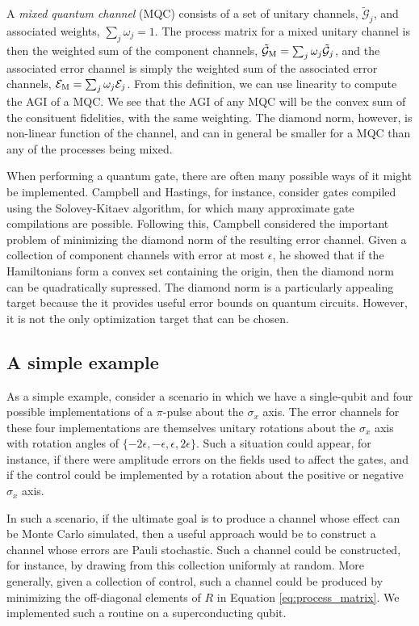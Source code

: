 \documentclass[aps,nofootinbib,pra,notitlepage,twocolumn]{revtex4-1}
\newcommand{\actual}{\ensuremath{\tilde{\mathcal{G}}}}
\newcommand{\error}{\ensuremath{{\mathcal{E}}}}
\begin{document}
A \textit{mixed quantum channel} (MQC) consists of a set of unitary channels, $\actual_j$, and associated weights, $\sum_j \omega_j = 1$.  The process matrix for a mixed unitary channel is then the weighted sum of the component channels, $\actual_{\rm M} = \sum_j \omega_j \actual_j$, and the associated error channel is simply the weighted sum of the associated error channels, $\error_{\rm M} = \sum_j \omega_j \error_j$. From this definition, we can use linearity to compute the AGI of a MQC. We see that the AGI of any MQC will be the convex sum of the consituent fidelities, with the same weighting. The diamond norm, however, is non-linear function of the channel, and can in general be smaller for a MQC than any of the processes being mixed. 

When performing a quantum gate, there are often many possible ways of it might be implemented. Campbell and Hastings, for instance, consider gates compiled using the Solovey-Kitaev algorithm, for which many approximate gate compilations are possible.\cite{Campbell2017, 1612.01011} Following this, Campbell considered the important problem of minimizing the diamond norm of the resulting error channel. Given a collection of component channels with error at most $\epsilon$, he showed that if the Hamiltonians form a convex set containing the origin, then the diamond norm can be quadratically supressed. The diamond norm is a particularly appealing target because the it provides useful error bounds on quantum circuits. However, it is not the only optimization target that can be chosen. 

\subsection{A simple example}
\label{sec:simple_example}
As a simple example, consider a scenario in which we have a single-qubit and four possible implementations of a $\pi$-pulse about the $\sigma_x$ axis. The error channels for these four implementations are themselves unitary rotations about the $\sigma_x$ axis with rotation angles of $\{-2\epsilon, -\epsilon, \epsilon, 2\epsilon\}$. Such a situation could appear, for instance, if there were amplitude errors on the fields used to affect the gates, and if the control could be implemented by a rotation about the positive or negative $\sigma_x$ axis.



In such a scenario, if the ultimate goal is to produce a channel whose effect can be Monte Carlo simulated, then a useful approach would be to construct a channel whose errors are Pauli stochastic. Such a channel could be constructed, for instance, by drawing from this collection uniformly at random. More generally, given a collection of control, such a channel could be produced by minimizing the off-diagonal elements of $R$ in Equation \ref{eq:process_matrix}. We implemented such a routine on a superconducting qubit.
\end{document}
